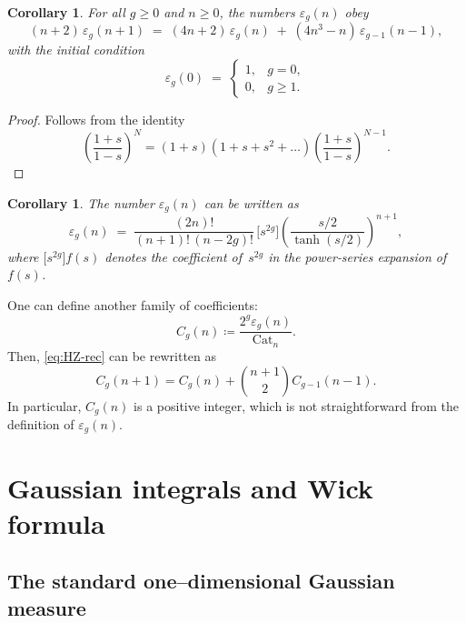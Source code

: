 \documentclass[letterpaper,11pt,oneside,reqno]{article}
\numberwithin{equation}{section}
\newtheorem{corollary}[proposition]{Corollary}
\theoremstyle{definition}
\begin{document}
\begin{corollary}\label{cor:HZ-recurrence} %
For all $g\ge 0$ and $n\ge 0$, the numbers $\varepsilon_g(n)$ obey
\begin{equation}\label{eq:HZ-rec} %
  (n+2)\,\varepsilon_g(n+1)
  \;=\;
  (4n+2)\,\varepsilon_g(n)
  \;+\;
  (4n^{3}-n)\,\varepsilon_{g-1}(n-1),
\end{equation}
with the initial condition
\[
  \varepsilon_g(0)
  \;=\;
  \begin{cases}
    1,& g=0,\\[4pt]
    0,& g\ge 1.
  \end{cases}
\]
\end{corollary}
\begin{proof}
	Follows from the identity
	\begin{equation*}
		\left( \frac{1+s}{1-s} \right)^{N}=
		(1+s)(1+s+s^2+\ldots )\left( \frac{1+s}{1-s} \right)^{N-1}.
	\end{equation*}
\end{proof}

\begin{corollary}\label{cor:epsg-explicit}
The number $\varepsilon_g(n)$ can be written as
\[
\varepsilon_g(n)\;=\;\frac{(2n)!}{(n+1)!\,(n-2g)!}\,
\bigl[s^{2g}\bigr]\!
\left(\frac{s/2}{\tanh(s/2)}\right)^{n+1},
\]
where $\bigl[s^{2g}\bigr]f(s)$ denotes the coefficient of $s^{2g}$ in the power‑series expansion of $f(s)$.
\end{corollary}



One can define another family of coefficients:
\begin{equation*}
	C_g(n)\coloneqq \frac{2^g \varepsilon_g(n)}{\mathrm{Cat}_n}.
\end{equation*}
Then, \eqref{eq:HZ-rec} can be rewritten as
\begin{equation*}
	C_g(n+1)=C_g(n)+\binom{n+1}2 C_{g-1}(n-1).
\end{equation*}
In particular, $C_g(n)$ is a positive integer, which is not straightforward from the
definition of $\varepsilon_g(n)$.


\section{Gaussian integrals and Wick formula}

\label{sec:gaussian-wick}

\subsection{The standard one–dimensional Gaussian measure}
\label{subsec:1d-gaussian}
\end{document}
